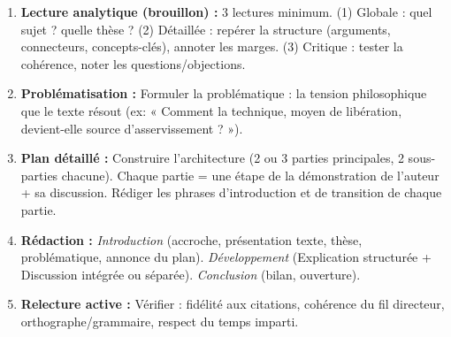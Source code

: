 \documentclass[11pt]{article}
\newcommand{\cle}[1]{{\popxbold\color{popdark}#1}}
\begin{document}
\begin{methode}
\begin{enumerate}
    \item \textbf{Lecture analytique (brouillon) :} 3 lectures minimum. (1) Globale : quel sujet ? quelle thèse ? (2) Détaillée : repérer la structure (arguments, connecteurs, concepts-clés), annoter les marges. (3) Critique : tester la cohérence, noter les questions/objections.
    \item \textbf{Problématisation :} Formuler la \cle{problématique} : la tension philosophique que le texte résout (ex: « Comment la technique, moyen de libération, devient-elle source d'asservissement ? »).
    \item \textbf{Plan détaillé :} Construire l'architecture (2 ou 3 parties principales, 2 sous-parties chacune). Chaque partie = une étape de la démonstration de l'auteur + sa discussion. Rédiger les \cle{phrases d'introduction} et de \cle{transition} de chaque partie.
    \item \textbf{Rédaction :} \emph{Introduction} (accroche, présentation texte, thèse, problématique, annonce du plan). \emph{Développement} (Explication structurée + Discussion intégrée ou séparée). \emph{Conclusion} (bilan, ouverture).
    \item \textbf{Relecture active :} Vérifier : fidélité aux citations, cohérence du fil directeur, orthographe/grammaire, respect du temps imparti.
\end{enumerate}
\end{methode}
\end{document}

